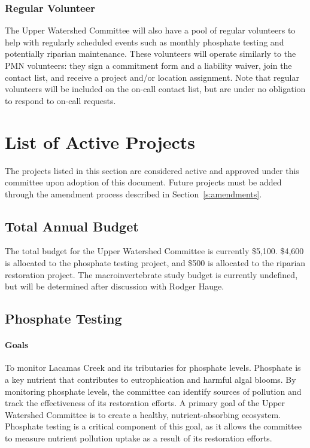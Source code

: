 \documentclass[letterpaper,11pt,leqno]{article}
\begin{document}
\subsubsection{Regular Volunteer}
The Upper Watershed Committee will also have a pool of regular volunteers to help with regularly scheduled events such as monthly phosphate testing and potentially riparian maintenance.
These volunteers will operate similarly to the PMN volunteers: they sign a commitment form and a liability waiver, join the contact list, and receive a project and/or location assignment.
Note that regular volunteers will be included on the on-call contact list, but are under no obligation to respond to on-call requests.

\section{List of Active Projects}\label{s:projects}
The projects listed in this section are considered active and approved under this committee upon adoption of this document. Future projects must be added through the amendment process described in Section~\ref{s:amendments}.

\subsection{Total Annual Budget}
The total budget for the Upper Watershed Committee is currently \$5,100. \$4,600 is allocated to the phosphate testing project, and \$500 is allocated to the riparian restoration project. The macroinvertebrate study budget is currently undefined, but will be determined after discussion with Rodger Hauge.

\subsection{Phosphate Testing}
\paragraph{Goals} To monitor Lacamas Creek and its tributaries for phosphate levels. Phosphate is a key nutrient that contributes to eutrophication and harmful algal blooms. By monitoring phosphate levels, the committee can identify sources of pollution and track the effectiveness of its restoration efforts. A primary goal
of the Upper Watershed Committee is to create a healthy, nutrient-absorbing ecosystem. Phosphate testing is a critical component of this goal, as it allows the committee to measure nutrient pollution uptake as a result of its restoration efforts.
\end{document}
